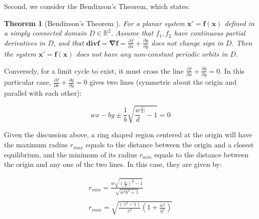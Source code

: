 \documentclass[12pt]{article}
\newtheorem*{theorem}{Theorem}
\begin{document}
Second, we consider the Bendixson's Theorem, which states:
\begin{theorem}[Bendixson's Theorem ]
  For a planar system $\mathbf{x'=f(x)}$ defined in a simply connected domain $D\in \mathbb{R}^2$. Assume that $f_1,f_2$ have continuous partial derivatives in $D$, and that $\mathbf{div} \mathbf{f=\nabla f}=\frac{\partial f}{\partial x}+\frac{\partial g}{\partial y}$ does not change sign in $D$. Then the system $\mathbf{x'=f(x)}$ does not have any non-constant periodic orbits in $D$.
\end{theorem}
  Conversely, for a limit cycle to exist, it must cross the line  $\frac{\partial f}{\partial x}+\frac{\partial g}{\partial y}=0$. In this particular case, $\frac{\partial f}{\partial x}+\frac{\partial g}{\partial y}=0$ gives two lines (symmetric about the origin and parallel with each other):

  \begin{equation}
    wx-by\pm \frac{1}{b}\sqrt{\frac{w}{d}^{\frac{3}{2}]}-1}=0
  \end{equation}

  Given the discussion above, a ring shaped region centered at the origin will have the maximum radius $r_{max}$ equals to the distance between the origin and a closest equilibrium, and the minimum of its radius $r_{min}$ equals to the distance between the origin and any one of the two lines. In this case, they are given by:

\begin{equation}
  \begin{matrix}
    r_{min}=\frac{w\sqrt{(\frac{w}{d})^{\frac{3}{2}}-1}}{\sqrt{w^2b^2+1}}\\
    \\
    r_{max}=\sqrt{\frac{(\gamma^2-1)}{c^2}(1+\frac{w^2}{b^2})}
  \end{matrix}
\end{equation}
\end{document}
